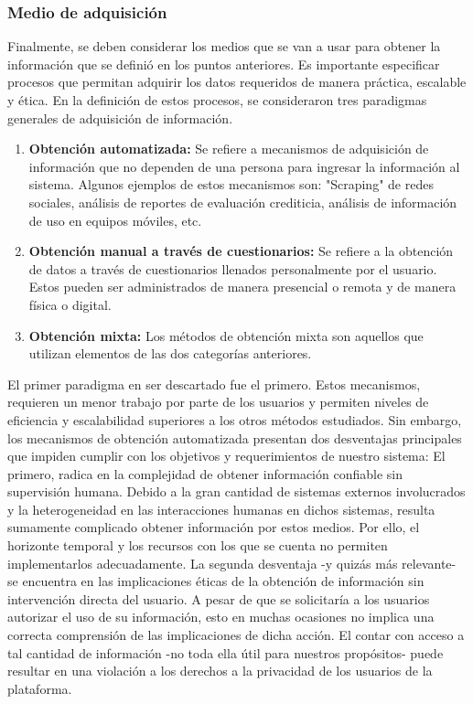 		\subsubsection{Medio de adquisición}
			Finalmente, se deben considerar los medios que se van a usar para obtener la información que se definió en los puntos anteriores. Es importante especificar procesos que permitan adquirir los datos requeridos de manera práctica, escalable y ética.
			En la definición de estos procesos, se consideraron tres paradigmas generales de adquisición de información.
			\begin{enumerate}
				\item \textbf{Obtención automatizada:} 
				Se refiere a mecanismos de adquisición de información que no dependen de una persona para ingresar la información al sistema. Algunos ejemplos de estos mecanismos son: "Scraping" de redes sociales, análisis de reportes de evaluación crediticia, análisis de información de uso en equipos móviles, etc.
				\item \textbf{Obtención manual a través de cuestionarios:}
				Se refiere a la obtención de datos a través de cuestionarios llenados personalmente por el usuario. Estos pueden ser administrados de manera presencial o remota y de manera física o digital. 
				\item \textbf{Obtención mixta:}
				Los métodos de obtención mixta son aquellos que utilizan elementos de las dos categorías anteriores.
			\end{enumerate}
			El primer paradigma en ser descartado fue el primero. Estos mecanismos, requieren un menor trabajo por parte de los usuarios y permiten niveles de eficiencia y escalabilidad superiores a los otros métodos estudiados. Sin embargo, los mecanismos de obtención automatizada presentan dos desventajas principales que impiden cumplir con los objetivos y requerimientos de nuestro sistema: El primero, radica en la complejidad de obtener información confiable sin supervisión humana. Debido a la gran cantidad de sistemas externos involucrados y la heterogeneidad en las interacciones humanas en dichos sistemas, resulta sumamente complicado obtener información por estos medios. Por ello, el horizonte temporal y los recursos con los que se cuenta no permiten implementarlos adecuadamente. La segunda desventaja -y quizás más relevante- se encuentra en las implicaciones éticas de la obtención de información sin intervención directa del usuario. A pesar de que se solicitaría a los usuarios autorizar el uso de su información, esto en muchas ocasiones no implica una correcta comprensión de las implicaciones de dicha acción. El contar con acceso a tal cantidad de información -no toda ella útil para nuestros propósitos- puede resultar en una violación a los derechos a la privacidad de los usuarios de la plataforma.\\

